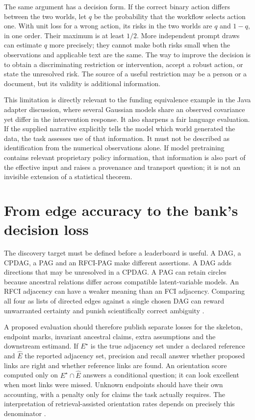 The same argument has a decision form. If the correct binary action differs
between the two worlds, let $q$ be the probability that the workflow selects
action one. With unit loss for a wrong action, its risks in the two worlds are
$q$ and $1-q$, in one order. Their maximum is at least $1/2$. More independent
prompt draws can estimate $q$ more precisely; they cannot make both risks small
when the observations and applicable text are the same. The way to improve the
decision is to obtain a discriminating restriction or intervention, accept a
robust action, or state the unresolved risk. The source of a useful restriction
may be a person or a document, but its validity is additional information.

This limitation is directly relevant to the funding equivalence example in the
Java adapter discussion, where several Gaussian models share an observed
covariance yet differ in the intervention response. It also sharpens a fair
language evaluation. If the supplied narrative explicitly tells the model which
world generated the data, the task assesses use of that information. It must
not be described as identification from the numerical observations alone. If
model pretraining contains relevant proprietary policy information, that
information is also part of the effective input and raises a provenance and
transport question; it is not an invisible extension of a statistical theorem.

\section{From edge accuracy to the bank's decision loss}

The discovery target must be defined before a leaderboard is useful. A DAG,
a CPDAG, a PAG and an RFCI-PAG make different assertions. A DAG adds directions
that may be unresolved in a CPDAG. A PAG can retain circles because ancestral
relations differ across compatible latent-variable models. An RFCI adjacency
can have a weaker meaning than an FCI adjacency. Comparing all four as lists of
directed edges against a single chosen DAG can reward unwarranted certainty
and punish scientifically correct ambiguity
\citep{exec13_latentr_colombo2012,exec13_latentr_primary}.

A proposed evaluation should therefore publish separate losses for the
skeleton, endpoint marks, invariant ancestral claims, extra assumptions and the
downstream estimand. If $E^\star$ is the true adjacency set under a declared
reference and $\widehat E$ the reported adjacency set, precision and recall
answer whether proposed links are right and whether reference links are found.
An orientation score computed only on $E^\star\cap\widehat E$ answers a
conditional question; it can look excellent when most links were missed.
Unknown endpoints should have their own accounting, with a penalty only for
claims the task actually requires. The interpretation of retrieval-assisted
orientation rates depends on precisely this denominator
\citep{v12_la_2402_15301}.

